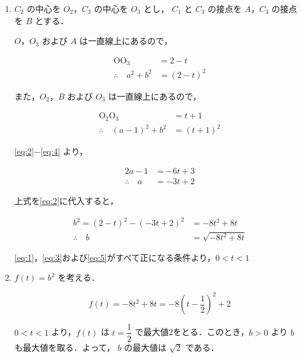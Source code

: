 \documentclass[a4paper]{ltjsarticle}
\begin{document}
\begin{enumerate}[label=(\arabic*)]
    \item $C_2$ の中心を $O_2$，$C_3$ の中心を $O_3$ とし， $C_1$ と $C_3$ の接点を $A$，$C_3$ の接点を $B$ とする．

          $O$，$O_3$ および $A$ は一直線上にあるので，

          \begin{align}
              \text{OO}_3             & =2-t\label{eq:1}     \\
              \therefore\quad a^2+b^2 & =(2-t)^2\label{eq:2}
          \end{align}

          また，$O_2$，$B$ および $O_3$ は一直線上にあるので，

          \begin{align}
              \text{O}_2\text{O}_3        & =t+1\label{eq:3}     \\
              \therefore\quad (a-1)^2+b^2 & =(t+1)^2\label{eq:4}
          \end{align}

          \eqref{eq:2}$-$\eqref{eq:4} より，

          \begin{align*}
              2a-1              & =-6t+3 \\
              \therefore\quad a & =-3t+2
          \end{align*}

          上式を\eqref{eq:2}に代入すると，

          \begin{align}
              b^2=(2-t)^2-(-3t+2)^2 & =-8t^2+8t\label{eq:5}     \\
              \therefore\quad b     & =\sqrt{-8t^2+8t}\nonumber
          \end{align}

          \eqref{eq:1}，\eqref{eq:3}および\eqref{eq:5}がすべて正になる条件より，$0<t<1$

    \item $f(t)=b^2$ を考える．

          \begin{equation*}
              f(t)=-8t^2+8t=-8\left(t-\frac{1}{2}\right)^2+2
          \end{equation*}

          $0<t<1$ より，$f(t)$ は $t=\dfrac{1}{2}$ で最大値2をとる．このとき，$b>0$ より $b$ も最大値を取る．よって， $b$ の最大値は $\sqrt{2}$ である．
\end{enumerate}

\end{document}
